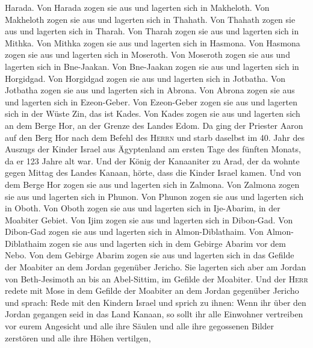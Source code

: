 Harada.  Von Harada zogen sie aus und lagerten sich in
Makheloth.  Von Makheloth zogen sie aus und lagerten sich
in Thahath.  Von Thahath zogen sie aus und lagerten sich
in Tharah.  Von Tharah zogen sie aus und lagerten sich in
Mithka.  Von Mithka zogen sie aus und lagerten sich in
Hasmona.  Von Hasmona zogen sie aus und lagerten sich in
Moseroth.  Von Moseroth zogen sie aus und lagerten sich
in Bne-Jaakan.  Von Bne-Jaakan zogen sie aus und lagerten
sich in Horgidgad.  Von Horgidgad zogen sie aus und
lagerten sich in Jotbatha.  Von Jotbatha zogen sie aus
und lagerten sich in Abrona.  Von Abrona zogen sie aus
und lagerten sich in Ezeon-Geber.  Von Ezeon-Geber zogen
sie aus und lagerten sich in der Wüste Zin, das ist Kades.
 Von Kades zogen sie aus und lagerten sich an dem Berge
Hor, an der Grenze des Landes Edom.  Da ging der Priester
Aaron auf den Berg Hor nach dem Befehl des \textsc{Herrn} und starb
daselbst im 40. Jahr des Auszugs der Kinder Israel aus Ägyptenland am
ersten Tage des fünften Monats,  da er 123 Jahre alt war.
 Und der König der Kanaaniter zu Arad, der da wohnte
gegen Mittag des Landes Kanaan, hörte, dass die Kinder Israel kamen.
 Und von dem Berge Hor zogen sie aus und lagerten sich in
Zalmona.  Von Zalmona zogen sie aus und lagerten sich in
Phunon.  Von Phunon zogen sie aus und lagerten sich in
Oboth.  Von Oboth zogen sie aus und lagerten sich in
Ije-Abarim, in der Moabiter Gebiet.  Von Ijim zogen sie
aus und lagerten sich in Dibon-Gad.  Von Dibon-Gad zogen
sie aus und lagerten sich in Almon-Diblathaim.  Von
Almon-Diblathaim zogen sie aus und lagerten sich in dem Gebirge Abarim
vor dem Nebo.  Von dem Gebirge Abarim zogen sie aus und
lagerten sich in das Gefilde der Moabiter an dem Jordan gegenüber
Jericho.  Sie lagerten sich aber am Jordan von
Beth-Jesimoth an bis an Abel-Sittim, im Gefilde der Moabiter.
 Und der \textsc{Herr} redete mit Mose in dem Gefilde der
Moabiter an dem Jordan gegenüber Jericho und sprach: 
Rede mit den Kindern Israel und sprich zu ihnen: Wenn ihr über den
Jordan gegangen seid in das Land Kanaan,  so sollt ihr
alle Einwohner vertreiben vor eurem Angesicht und alle ihre Säulen und
alle ihre gegossenen Bilder zerstören und alle ihre Höhen vertilgen,
